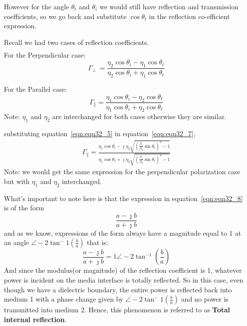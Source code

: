 However for the angle $\theta_t$ and $\theta_i$ we would still have reflection and transmission coefficients, so we go back and substitute $\cos\theta_t$ in the reflection co-efficient expression.

Recall we had two cases of reflection coefficients.
\begin{align*}
\end{align*}For the Perpendicular case:
\begin{equation}
\Gamma_\perp\ = \frac{\eta_2\cos\theta_i - \eta_1\cos\theta_t}{\eta_2\cos\theta_i + \eta_1\cos\theta_t}
\label{eqn:eqn32_6}
\end{equation}

For the Parallel case:
\begin{equation}
\Gamma_\parallel = \frac{\eta_1\cos\theta_i - \eta_2\cos\theta_t}{\eta_1\cos\theta_i + \eta_2\cos\theta_t}
\label{eqn:eqn32_7}
\end{equation}
Note: $\eta_1$ and $\eta_2$ are interchanged for both cases otherwise they are similar. 

substituting equation~\ref{eqn:eqn32_5} in equation~\ref{eqn:eqn32_7},
\begin{align}
\Gamma_\parallel = \frac{\eta_1\cos\theta_i - \jmath\eta_2\sqrt{(\frac{\beta_1}{\beta_2}\sin\theta_i)^2-1}}{\eta_1\cos\theta_i + \jmath\eta_2\sqrt{(\frac{\beta_1}{\beta_2}\sin\theta_i)^2-1}}
\label{eqn:eqn32_8}
\end{align}
Note: we would get the same expression for the perpendicular polarization case but with $\eta_1$ and $\eta_2$ interchanged. 

What's important to note here is that the expression in equation~\ref{eqn:eqn32_8} is of the form
\begin{equation}
\frac{a - \jmath b}{a + \jmath b}
\end{equation}
and as we know, expressions of the form always have a magnitude equal  to 1 at an angle $\angle-2\tan^-{1}(\frac{b}{a})$ that is:
\begin{equation}
\frac{a - \jmath b}{a + \jmath b} = 1\angle - 2\tan^{-1}(\frac{b}{a})
\end{equation} 
And since the modulus(or magnitude) of the reflection coefficient is 1, whatever power is incident on the media interface is totally reflected.
So in this case, even though we have a dielectric boundary, the entire power is reflected back into medium 1 with a phase change given by $\angle-2\tan^-{1}(\frac{b}{a})$ and no power is transmitted into medium 2. Hence, this phenomenon is referred to as \textbf{Total internal reflection}.

